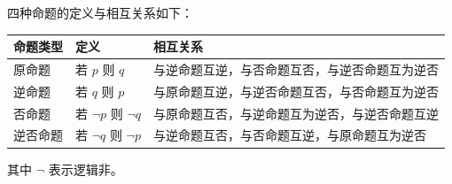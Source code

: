 \begin{statementbox}
四种命题的定义与相互关系如下：

\begin{center}
\small
\renewcommand{\arraystretch}{1.2}
\begin{tabularx}{\linewidth}{|X|X|X|}
\hline
\textbf{命题类型} & \textbf{定义} & \textbf{相互关系} \\
\hline
原命题   & 若 \(p\) 则 \(q\) & 与逆命题互逆，与否命题互否，与逆否命题互为逆否 \\
\hline
逆命题   & 若 \(q\) 则 \(p\) & 与原命题互逆，与逆否命题互否，与否命题互为逆否 \\
\hline
否命题   & 若 \(\lnot p\) 则 \(\lnot q\) & 与原命题互否，与逆命题互为逆否，与逆否命题互逆 \\
\hline
逆否命题 & 若 \(\lnot q\) 则 \(\lnot p\) & 与逆命题互否，与否命题互逆，与原命题互为逆否 \\
\hline
\end{tabularx}
\end{center}

其中 \(\lnot\) 表示逻辑非。
\end{statementbox}